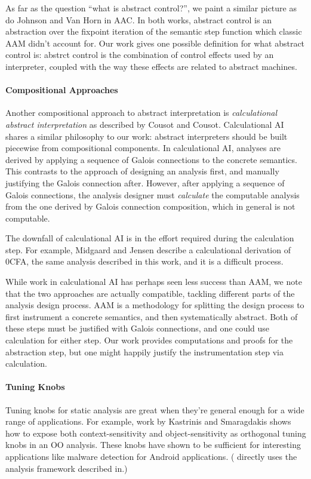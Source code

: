 \documentclass{article}
\begin{document}
As far as the question “what is abstract control?”, we paint a similar picture as do Johnson and Van Horn in AAC.
In both works, abstract control is an abstraction over the fixpoint iteration of the semantic step function which classic AAM didn't account for.
Our work gives one possible definition for what abstract control is: 
  abstrct control is the combination of control effects used by an interpreter,
  coupled with the way these effects are related to abstract machines.

\paragraph{Compositional Approaches}
Another compositional approach to abstract interpretation is \emph{calculational abstract interpretation}\cite{cousot:1999:calculational} 
  as described by Cousot and Cousot.
Calculational AI shares a similar philosophy to our work: abstract interpreters should be built piecewise from compositional components.
In calculational AI, analyses are derived by applying a sequence of Galois connections to the concrete semantics.
This contrasts to the approach of designing an analysis first, and manually justifying the Galois connection after.
However, after applying a sequence of Galois connections, 
  the analysis designer must \emph{calculate} the computable analysis from the one derived by Galois connection composition,
  which in general is not computable.

The downfall of calculational AI is in the effort required during the calculation step.
For example, Midgaard and Jensen\cite{midtgaard:2008:calculational-cfa} describe a calculational derivation of 0CFA, the same analysis described in this work, and it is a difficult process.

While work in calculational AI has perhaps seen less success than AAM, 
  we note that the two approaches are actually compatible, tackling different parts of the analysis design process.
AAM is a methodology for splitting the design process to first instrument a concrete semantics, and then systematically abstract.
Both of these steps must be justified with Galois connections, and one could use calculation for either step.
Our work provides computations and proofs for the abstraction step, but one might happily justify the instrumentation step via calculation.

\paragraph{Tuning Knobs}
Tuning knobs for static analysis are great when they're general enough for a wide range of applications.
For example, work by Kastrinis and Smaragdakis\cite{kastrinis:2013:hybrid-points-to}\cite{smaragdakis:2011:pick-your-contexts-well} 
  shows how to expose both context-sensitivity and object-sensitivity as orthogonal tuning knobs in an OO analysis.
These knobs have shown to be sufficient for interesting applications like malware detection for Android applications\cite{feng:2014:apposcopy}.
(\cite{feng:2014:apposcopy} directly uses the analysis framework described in\cite{kastrinis:2013:hybrid-points-to}.)
\end{document}
